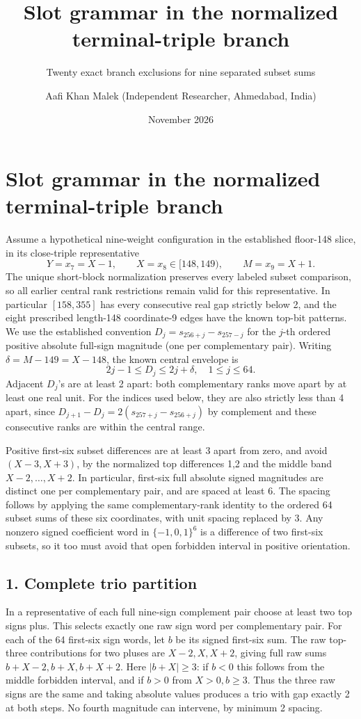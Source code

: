 \documentclass[
  11pt,
]{article}
\title{Slot grammar in the normalized terminal-triple branch}
\subtitle{Twenty exact branch exclusions for nine separated subset sums}
\author{Aafi Khan Malek (Independent Researcher, Ahmedabad, India)}
\date{November 2026}
\begin{document}
\maketitle

\section{Slot grammar in the normalized terminal-triple
branch}\label{slot-grammar-in-the-normalized-terminal-triple-branch}

Assume a hypothetical nine-weight configuration in the established
floor-148 slice, in its close-triple representative \[
Y=x_7=X-1,\qquad X=x_8\in[148,149),\qquad M=x_9=X+1 .
\] The unique short-block normalization preserves every labeled subset
comparison, so all earlier central rank restrictions remain valid for
this representative. In particular \([158,355]\) has every consecutive
real gap strictly below 2, and the eight prescribed length-148
coordinate-9 edges have the known top-bit patterns. We use the
established convention \(D_j=s_{256+j}-s_{257-j}\) for the \(j\)-th
ordered positive absolute full-sign magnitude (one per complementary
pair). Writing \(\delta=M-149=X-148\), the known central envelope is \[
2j-1\le D_j\le2j+\delta,\quad 1\le j\le64.
\] Adjacent \(D_j\)'s are at least 2 apart: both complementary ranks
move apart by at least one real unit. For the indices used below, they
are also strictly less than 4 apart, since
\(D_{j+1}-D_j=2(s_{257+j}-s_{256+j})\) by complement and these
consecutive ranks are within the central range.

Positive first-six subset differences are at least 3 apart from zero,
and avoid \((X-3,X+3)\), by the normalized top differences 1,2 and the
middle band \(X-2,\ldots,X+2\). In particular, first-six full absolute
signed magnitudes are distinct one per complementary pair, and are
spaced at least 6. The spacing follows by applying the same
complementary-rank identity to the ordered 64 subset sums of these six
coordinates, with unit spacing replaced by 3. Any nonzero signed
coefficient word in \(\{-1,0,1\}^6\) is a difference of two first-six
subsets, so it too must avoid that open forbidden interval in positive
orientation.

\subsection{1. Complete trio partition}\label{complete-trio-partition}

In a representative of each full nine-sign complement pair choose at
least two top signs plus. This selects exactly one raw sign word per
complementary pair. For each of the 64 first-six sign words, let \(b\)
be its signed first-six sum. The raw top-three contributions for two
pluses are \(X-2,X,X+2\), giving full raw sums \(b+X-2,b+X,b+X+2\). Here
\(|b+X|\ge3\): if \(b<0\) this follows from the middle forbidden
interval, and if \(b>0\) from \(X>0,b\ge3\). Thus the three raw signs
are the same and taking absolute values produces a trio with gap exactly
2 at both steps. No fourth magnitude can intervene, by minimum 2
spacing.
\end{document}
